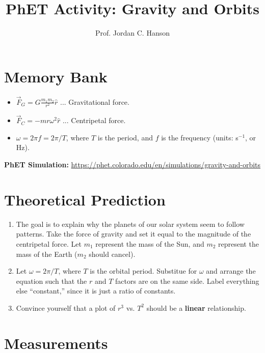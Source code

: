 \documentclass{article}
\begin{document}
\title{PhET Activity: Gravity and Orbits}
\author{Prof. Jordan C. Hanson}

\maketitle

\section{Memory Bank}

\begin{itemize}
\item $\vec{F}_G = G \frac{m_1 m_2}{r^2}\hat{r}$ ... Gravitational force.
\item $\vec{F}_{C} = -m r \omega^2 \hat{r}$ ... Centripetal force.
\item $\omega = 2\pi f = 2\pi/T$, where $T$ is the period, and $f$ is the frequency (units: s$^{-1}$, or Hz).
\end{itemize}

\textbf{PhET Simulation:} \url{https://phet.colorado.edu/en/simulations/gravity-and-orbits}

\section{Theoretical Prediction}

\begin{enumerate}
\item The goal is to explain why the planets of our solar system seem to follow patterns.  Take the force of gravity and set it equal to the magnitude of the centripetal force.  Let $m_1$ represent the mass of the Sun, and $m_2$ represent the mass of the Earth ($m_2$ should cancel).
\item Let $\omega = 2\pi/T$, where $T$ is the orbital period.  Substitue for $\omega$ and arrange the equation such that the $r$ and $T$ factors are on the same side.  Label everything else ``constant,'' since it is just a ratio of constants.
\item Convince yourself that a plot of $r^3$ vs. $T^2$ should be a \textbf{linear} relationship.
\end{enumerate}

\section{Measurements}
\end{document}
